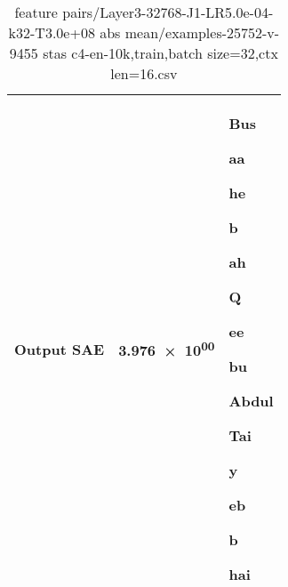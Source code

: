 \begin{table}
\begin{longtable}{lrl}
Output SAE & \num{3.976e+00} & \colorbox{Magenta!0.000}{\strut Bus} \colorbox{Magenta!0.000}{\strut aa} \colorbox{Magenta!27.014}{\strut he} \colorbox{Magenta!25.000}{\strut b} \colorbox{Magenta!31.605}{\strut ah} \colorbox{Magenta!17.080}{\strut  Q} \colorbox{Magenta!44.027}{\strut ee} \colorbox{Magenta!45.638}{\strut bu} \colorbox{Magenta!0.000}{\strut  Abdul} \colorbox{Magenta!0.000}{\strut  Tai} \colorbox{Magenta!22.332}{\strut y} \colorbox{Magenta!26.710}{\strut eb} \colorbox{Magenta!26.373}{\strut b} \colorbox{Magenta!23.512}{\strut hai} \\
\bottomrule
\end{longtable}
\caption{feature pairs/Layer3-32768-J1-LR5.0e-04-k32-T3.0e+08 abs mean/examples-25752-v-9455 stas c4-en-10k,train,batch size=32,ctx len=16.csv}
\end{table}